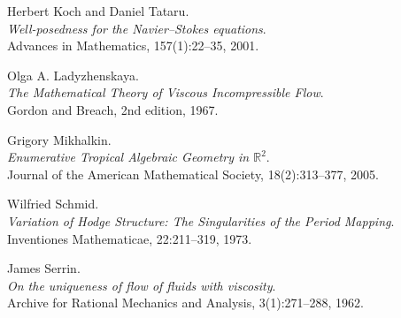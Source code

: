 \documentclass[11pt]{article}
\theoremstyle{definition}
\begin{document}
\begin{thebibliography}{99}
Herbert Koch and Daniel Tataru.\\
\textit{Well-posedness for the Navier–Stokes equations}.\\
Advances in Mathematics, 157(1):22--35, 2001.

Olga A. Ladyzhenskaya.\\
\textit{The Mathematical Theory of Viscous Incompressible Flow}.\\
Gordon and Breach, 2nd edition, 1967.

Grigory Mikhalkin.\\
\textit{Enumerative Tropical Algebraic Geometry in $\mathbb{R}^2$}.\\
Journal of the American Mathematical Society, 18(2):313--377, 2005.

Wilfried Schmid.\\
\textit{Variation of Hodge Structure: The Singularities of the Period Mapping}.\\
Inventiones Mathematicae, 22:211--319, 1973.

James Serrin.\\
\textit{On the uniqueness of flow of fluids with viscosity}.\\
Archive for Rational Mechanics and Analysis, 3(1):271--288, 1962.

\end{thebibliography}
\end{document}
